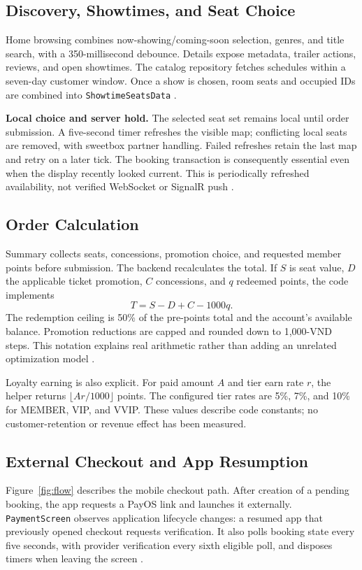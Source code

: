 \documentclass[conference]{IEEEtran}
\newcommand{\code}[1]{\texttt{#1}}
\begin{document}
\subsection{Discovery, Showtimes, and Seat Choice}
Home browsing combines now-showing/coming-soon selection, genres, and title
search, with a 350-millisecond debounce. Details expose metadata, trailer
actions, reviews, and open showtimes. The catalog repository fetches schedules
within a seven-day customer window. Once a show is chosen, room seats and
occupied IDs are combined into \code{ShowtimeSeatsData} \cite{client}.

\textbf{Local choice and server hold.} The selected seat set remains local until order submission. A five-second
timer refreshes the visible map; conflicting local seats are removed, with
sweetbox partner handling. Failed refreshes retain the last map and retry on a
later tick. The booking transaction is consequently essential even when the
display recently looked current. This is periodically refreshed availability,
not verified WebSocket or SignalR push \cite{client,booking}.

\subsection{Order Calculation}
Summary collects seats, concessions, promotion choice, and requested member
points before submission. The backend recalculates the total. If $S$ is seat
value, $D$ the applicable ticket promotion, $C$ concessions, and $q$ redeemed
points, the code implements
\begin{equation}
T=S-D+C-1000q .\label{eq:total}
\end{equation}
The redemption ceiling is 50\% of the pre-points total and the account's
available balance. Promotion reductions are capped and rounded down to
1,000-VND steps. This notation explains real arithmetic rather than adding
an unrelated optimization model \cite{booking}.

Loyalty earning is also explicit. For paid amount $A$ and tier earn rate $r$,
the helper returns $\lfloor Ar/1000\rfloor$ points. The configured tier rates
are 5\%, 7\%, and 10\% for MEMBER, VIP, and VVIP. These values describe code
constants; no customer-retention or revenue effect has been measured.

\subsection{External Checkout and App Resumption}
Figure~\ref{fig:flow} describes the mobile checkout path. After creation of a
pending booking, the app requests a PayOS link and launches it externally.
\code{PaymentScreen} observes application lifecycle changes: a resumed app
that previously opened checkout requests verification. It also polls booking
state every five seconds, with provider verification every sixth eligible
poll, and disposes timers when leaving the screen \cite{client}.

\end{document}
